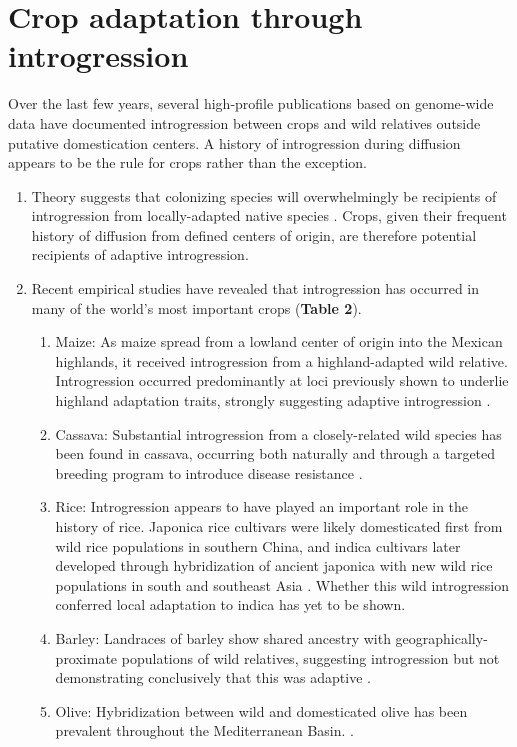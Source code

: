 \documentclass[11pt]{article}
\begin{document}
\section*{Crop adaptation through introgression}
Over the last few years, several high-profile publications based on genome-wide data have documented introgression between crops and wild relatives outside putative domestication centers. A history of introgression during diffusion appears to be the rule for crops rather than the exception.
\begin{enumerate}
	\item{Theory suggests that colonizing species will overwhelmingly be recipients of introgression from locally-adapted native species \cite{Currat2008}. Crops, given their frequent history of diffusion from defined centers of origin, are therefore potential recipients of adaptive introgression.}
	\item{Recent empirical studies have revealed that introgression has occurred in many of the world's most important crops (\textbf{Table 2}).}
	\begin{enumerate}
		\item{Maize: As maize spread from a lowland center of origin into the Mexican highlands, it received introgression from a highland-adapted wild relative.  Introgression occurred predominantly at loci previously shown to underlie highland adaptation traits, strongly suggesting adaptive introgression \cite{Hufford2013}.}
		\item{Cassava: Substantial introgression from a closely-related wild species has been found in cassava, occurring both naturally and through a targeted breeding program to introduce disease resistance \cite{Bredeson2016}.}
		\item{Rice: Introgression appears to have played an important role in the history of rice.  Japonica rice cultivars were likely domesticated first from wild rice populations in southern China, and indica cultivars later developed through hybridization of ancient japonica with new wild rice populations in south and southeast Asia \cite{Huang2012}. Whether this wild introgression conferred local adaptation to indica has yet to be shown.}
		\item{Barley: Landraces of barley show shared ancestry with geographically-proximate populations of wild relatives, suggesting introgression but not demonstrating conclusively that this was adaptive \cite{Poets2015}.}
		\item{Olive: Hybridization between wild and domesticated olive has been prevalent throughout the Mediterranean Basin. \cite{Diez2015}.}

\end{enumerate}
\end{enumerate}
\end{document}
